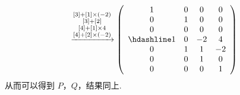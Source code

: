 \documentclass[12pt,fontset=fandol]{ctexart}
\begin{document}
\begin{solve}
\begin{enumerate}
\begin{gather*}
                  \xrightarrow{\substack{[3] + [1] \times (-2) \\ [3] + [2] \\ [4] + [1] \times 4 \\ [4] + [2] \times (-2)}}
                  \left(\begin{array}{cccc}
                      1 & 0 & 0  & 0  \\
                      0 & 1 & 0  & 0  \\
                      0 & 0 & 0  & 0  \\ \hdashline
                      1 & 0 & -2 & 4  \\
                      0 & 1 & 1  & -2 \\
                      0 & 0 & 1  & 0  \\
                      0 & 0 & 0  & 1
                  \end{array}\right)
              \end{gather*}
              从而可以得到 $P$，$Q$，结果同上.
    \end{enumerate}
\end{solve}
\end{document}
